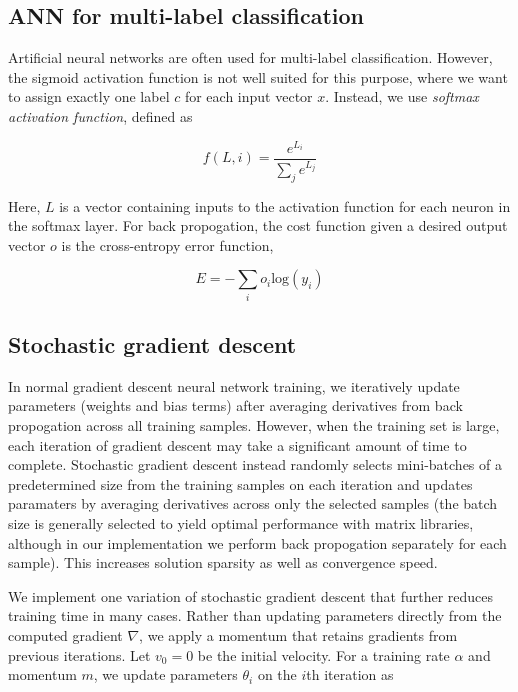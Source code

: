 \documentclass[10pt,twocolumn]{article}
\begin{document}
\subsection{ANN for multi-label classification}

Artificial neural networks are often used for multi-label classification. However, the sigmoid activation function is not well suited for this purpose, where we want to assign exactly one label $c$ for each input vector $x$. Instead, we use \emph{softmax activation function}, defined as

$$f(L, i) = \frac{e^{L_i}}{\sum_j e^{L_j}}$$

Here, $L$ is a vector containing inputs to the activation function for each neuron in the softmax layer. For back propogation, the cost function given a desired output vector $o$ is the cross-entropy error function,

$$E = -\sum_i o_i \text{log}(y_i)$$


\subsection{Stochastic gradient descent}

In normal gradient descent neural network training, we iteratively update parameters (weights and bias terms) after averaging derivatives from back propogation across all training samples. However, when the training set is large, each iteration of gradient descent may take a significant amount of time to complete. Stochastic gradient descent instead randomly selects mini-batches of a predetermined size from the training samples on each iteration and updates paramaters by averaging derivatives across only the selected samples (the batch size is generally selected to yield optimal performance with matrix libraries, although in our implementation we perform back propogation separately for each sample). This increases solution sparsity as well as convergence speed.

We implement one variation of stochastic gradient descent that further reduces training time in many cases. Rather than updating parameters directly from the computed gradient $\nabla$, we apply a momentum that retains gradients from previous iterations. Let $v_0 = 0$ be the initial velocity. For a training rate $\alpha$ and momentum $m$, we update parameters $\theta_i$ on the $i$th iteration as

\end{document}
